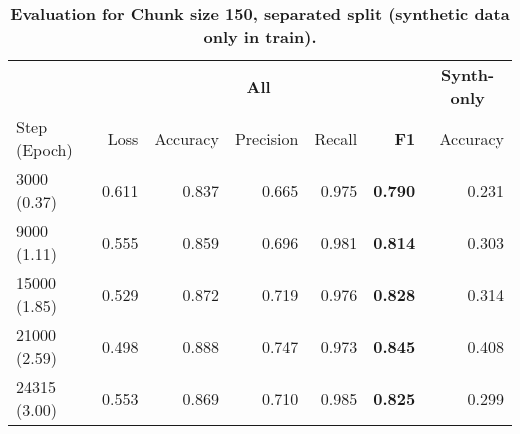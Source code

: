 \begin{table}[H]
\centering
\small
\caption[Evaluation for Chunk Size 150, Separated Split]{\textbf{Evaluation for Chunk size 150, separated split (synthetic data only in train).}}
\label{tab:150_separated}
\begin{tabular}{@{}lrrrr rr@{}}
\toprule
  & \multicolumn{5}{c}{\textbf{All}} 
  & \multicolumn{1}{c}{\textbf{Synth-only}} \\
\cmidrule(lr){2-6} \cmidrule(lr){7-7} 
Step (Epoch) & Loss & Accuracy & Precision & Recall & \textbf{F1} 
& Accuracy \\
\midrule
3000 (0.37) & 0.611 & 0.837 & 0.665 & 0.975 & \textbf{0.790} & 0.231  \\
9000 (1.11) & 0.555 & 0.859 & 0.696 & 0.981 & \textbf{0.814} & 0.303  \\
15000 (1.85) & 0.529 & 0.872 & 0.719 & 0.976 & \textbf{0.828} & 0.314  \\
21000 (2.59) & 0.498 & 0.888 & 0.747 & 0.973 & \textbf{0.845} & 0.408  \\
24315 (3.00) & 0.553 & 0.869 & 0.710 & 0.985 & \textbf{0.825} & 0.299 \\
\bottomrule
\end{tabular}
\end{table}
